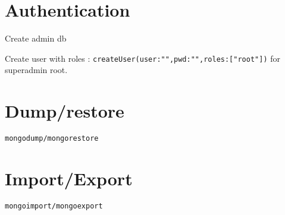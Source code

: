 \section*{Authentication}

Create admin db

Create user with roles : \texttt{createUser({user:"",pwd:"",roles:["root"]})} for superadmin root.


\section*{Dump/restore}

\texttt{mongodump/mongorestore}


\section*{Import/Export}

\texttt{mongoimport/mongoexport}





















